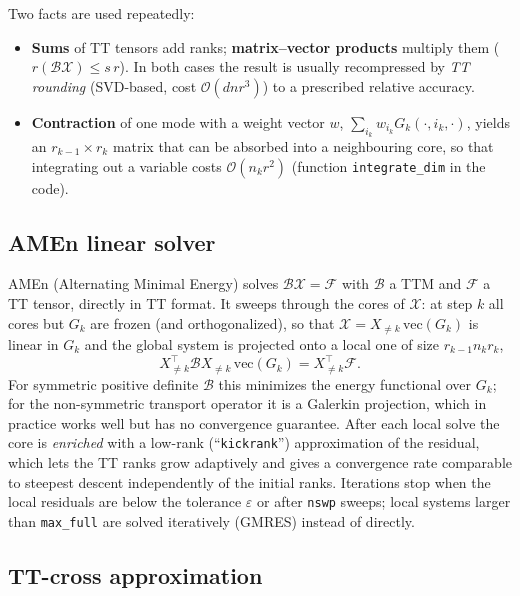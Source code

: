 \documentclass[11pt,a4paper]{article}
\numberwithin{equation}{section}
\theoremstyle{remark}
\begin{document}
Two facts are used repeatedly:
\begin{itemize}[nosep]
\item \textbf{Sums} of TT tensors add ranks; \textbf{matrix--vector products} multiply them ($r(\mathcal{B}\mathcal{X})\le s\,r$). In both cases the result is usually recompressed by \emph{TT rounding} (SVD-based, cost $\mathcal{O}(dnr^3)$) to a prescribed relative accuracy.
\item \textbf{Contraction} of one mode with a weight vector $w$, $\sum_{i_k}w_{i_k}G_k(\cdot,i_k,\cdot)$, yields an $r_{k-1}\times r_k$ matrix that can be absorbed into a neighbouring core, so that integrating out a variable costs $\mathcal{O}(n_kr^2)$ (function \texttt{integrate\_dim} in the code).
\end{itemize}

\subsection{AMEn linear solver}

AMEn (Alternating Minimal Energy) \cite{AMEn} solves $\mathcal{B}\mathcal{X}=\mathcal{F}$ with $\mathcal{B}$ a TTM and $\mathcal{F}$ a TT tensor, directly in TT format.
It sweeps through the cores of $\mathcal{X}$: at step $k$ all cores but $G_k$ are frozen (and orthogonalized), so that $\mathcal{X}=X_{\neq k}\,\mathrm{vec}(G_k)$ is linear in $G_k$ and the global system is projected onto a local one of size $r_{k-1}n_kr_k$,
\begin{equation}
X_{\neq k}^\top\mathcal{B}X_{\neq k}\,\mathrm{vec}(G_k)=X_{\neq k}^\top\mathcal{F}.
\end{equation}
For symmetric positive definite $\mathcal{B}$ this minimizes the energy functional over $G_k$; for the non-symmetric transport operator it is a Galerkin projection, which in practice works well but has no convergence guarantee.
After each local solve the core is \emph{enriched} with a low-rank (``\texttt{kickrank}'') approximation of the residual, which lets the TT ranks grow adaptively and gives a convergence rate comparable to steepest descent independently of the initial ranks.
Iterations stop when the local residuals are below the tolerance $\varepsilon$ or after \texttt{nswp} sweeps; local systems larger than \texttt{max\_full} are solved iteratively (GMRES) instead of directly.

\subsection{TT-cross approximation}
\end{document}
